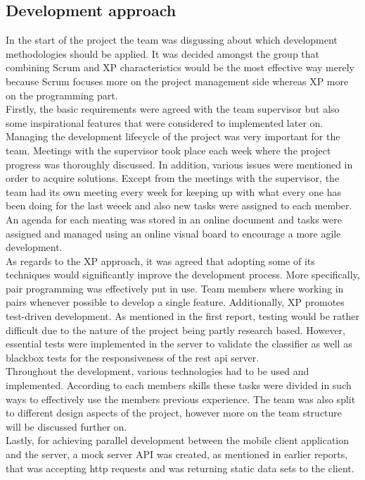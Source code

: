 \subsection{Development approach} In the start of the project the team was disgussing about which 
development methodologies should be applied. It was decided amongst the group that combining Scrum 
and XP characteristics would be the most effective way merely because Scrum focuses more on the 
project management side whereas XP more on the programming part.\\ 
Firstly, the basic requirements were agreed with the team supervisor but also some inspirational 
features that were considered to implemented later on. Managing the development lifecycle of the 
project was very important for the team. Meetings with the supervisor took place each week where the 
project progress was thoroughly discussed. In addition, various issues were mentioned in order to 
acquire solutions. Except from the meetings with the supervisor, the team had its own meeting every 
week for keeping up with what every one has been doing for the last weeek and also new tasks were 
assigned to each member. An agenda for each meating was stored in an online document and tasks were 
assigned and managed using an online visual board to encourage a more agile development.\\ 
As regards to the XP approach, it was agreed that adopting some of its techniques would 
significantly improve the development process. More specifically, pair programming was effectively 
put in use. Team members where working in pairs whenever possible to develop a single feature. 
Additionally, XP promotes test-driven development. As mentioned in the first report, testing would 
be rather difficult due to the nature of the project being partly research based. However, essential 
tests were implemented in the server to validate the classifier as well as blackbox tests for the 
responsiveness of the rest api server. \\
Throughout the development, various technologies had to be 
used and implemented. According to each members skills these tasks were divided in such ways to 
effectively use the members previous experience. The team was also split to different design aspects 
of the project, however more on the team structure will be discussed further on.\\ 
Lastly, for achieving parallel development between the mobile client application and the server, a 
mock server API was created, as mentioned in earlier reports, that was accepting http requests and 
was returning static data sets to the client. 

